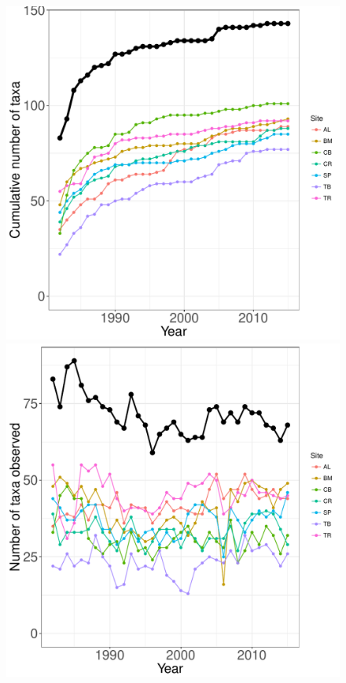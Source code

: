 \documentclass[11pt, oneside]{article}
\begin{document}
\begin{figure}[h!]
\centering
\includegraphics[scale = 0.4]{ntl-zooplankton-stanleyLottig_species_accumulation_curve.pdf}
\includegraphics[scale = 0.4]{ntl-zooplankton-stanleyLottig_num_taxa_over_time.pdf}

\end{figure}
\end{document}
